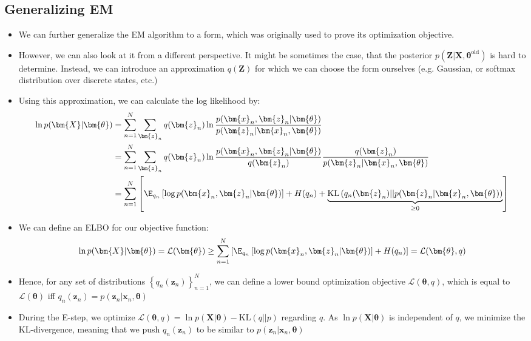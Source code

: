 \subsection{Generalizing EM}
\begin{itemize}
	\item We can further generalize the EM algorithm to a form, which was originally used to prove its optimization objective. 
	\item However, we can also look at it from a different perspective. It might be sometimes the case, that the posterior $p(\bm{Z}|\bm{X},\bm{\theta}^{\text{old}})$ is hard to determine. Instead, we can introduce an approximation $q(\bm{Z})$ for which we can choose the form ourselves (e.g. Gaussian, or softmax distribution over discrete states, etc.)
	\item Using this approximation, we can calculate the log likelihood by:
	\begin{equation*}
		\begin{split}
			\ln p(\bm{X}|\bm{\theta}) & = \sum_{n=1}^{N} \sum_{\bm{z}_n} q(\bm{z}_n)\ln \frac{p(\bm{x}_n, \bm{z}_n|\bm{\theta})}{p(\bm{z}_n|\bm{x}_n, \bm{\theta})}\\
			 & = \sum_{n=1}^{N} \sum_{\bm{z}_n} q(\bm{z}_n)\ln \frac{p(\bm{x}_n, \bm{z}_n|\bm{\theta})}{q(\bm{z}_n)}\frac{q(\bm{z}_n)}{p(\bm{z}_n|\bm{x}_n, \bm{\theta})}\\
			 & = \sum_{n=1}^{N} \left[\E_{q_n}\left[\log p(\bm{x}_n, \bm{z}_n|\bm{\theta})\right] + H(q_n) + \underbrace{\text{KL}\left(q_n(\bm{z}_n)||p(\bm{z}_n|\bm{x}_n, \bm{\theta})\right)}_{\geq 0}\right]\\
		\end{split}
	\end{equation*}
	\item We can define an ELBO for our objective function:
	$$\ln p(\bm{X}|\bm{\theta}) = \mathcal{L}(\bm{\theta}) \geq  \sum_{n=1}^{N} \left[\E_{q_n}\left[\log p(\bm{x}_n, \bm{z}_n|\bm{\theta})\right] + H(q_n)\right] = \mathcal{L}(\bm{\theta}, q)$$
	\item Hence, for any set of distributions $\left\{q_n(\bm{z}_n)\right\}_{n=1}^{N}$, we can define a lower bound optimization objective $\mathcal{L}(\bm{\theta}, q)$, which is equal to $\mathcal{L}(\bm{\theta})$ iff $q_n(\bm{z}_n)=p(\bm{z}_n\vert \bm{x}_n, \bm{\theta})$
	\item During the E-step, we optimize $\mathcal{L}(\bm{\theta}, q)=\ln p(\bm{X}|\bm{\theta})-\text{KL}(q||p)$ regarding $q$. As $\ln p(\bm{X}|\bm{\theta})$ is independent of $q$, we minimize the KL-divergence, meaning that we push $q_n(\bm{z}_n)$ to be similar to $p(\bm{z}_n\vert \bm{x}_n, \bm{\theta})$

\end{itemize}
